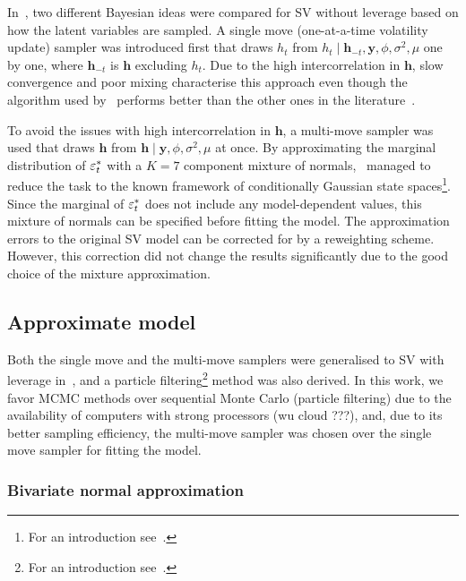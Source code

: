 In~\citet{Kim1998}, two different Bayesian ideas were compared for SV without leverage based on how the latent variables are sampled.
A single move (one-at-a-time volatility update) sampler was introduced first that draws $h_t$ from $h_t\mid\bm{h}_{-t},\bm{y},\phi,\sigma^2,\mu$ one by one, where $\bm{h}_{-t}$ is $\bm{h}$ excluding $h_t$.
Due to the high intercorrelation in $\bm{h}$, slow convergence and poor mixing characterise this approach even though the algorithm used by~\citeauthor{Kim1998} performs better than the other ones in the literature~\citep{shephard1993fitting,jarquier1994bayesian,shephard1994comment,shephard1997likelihood,geweke1994bayesian}.

To avoid the issues with high intercorrelation in $\bm{h}$, a multi-move sampler was used that draws $\bm{h}$ from $\bm{h}\mid\bm{y},\phi,\sigma^2,\mu$ at once.
By approximating the marginal distribution of $\varepsilon_t^\ast$ with a $K=7$ component mixture of normals,~\citeauthor{Kim1998} managed to reduce the task to the known framework of conditionally Gaussian state spaces\footnote{For an introduction see~\citet{Kitagawa1996}.}.
Since the marginal of $\varepsilon_t^\ast$ does not include any model-dependent values, this mixture of normals can be specified before fitting the model.
The approximation errors to the original SV model can be corrected for by a reweighting scheme.
However, this correction did not change the results significantly due to the good choice of the mixture approximation.


\subsection{Approximate model}

Both the single move and the multi-move samplers were generalised to SV with leverage in~\citet{Omori2007}, and a particle filtering\footnote{For an introduction see~\citet{Johannes2009}.} method was also derived.
In this work, we favor MCMC methods over sequential Monte Carlo (particle filtering) due to the availability of computers with strong processors (wu cloud ???), and, due to its better sampling efficiency, the multi-move sampler was chosen over the single move sampler for fitting the model.

\subsubsection{Bivariate normal approximation}


